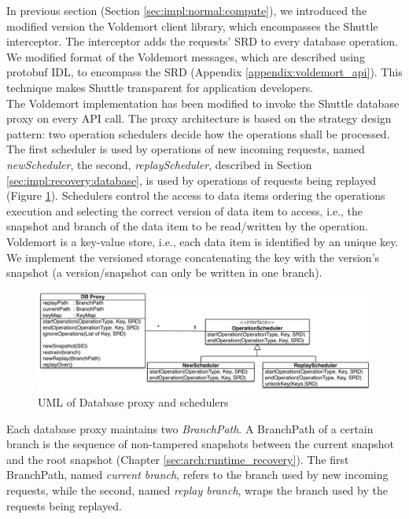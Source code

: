 In previous section (Section \ref{sec:impl:normal:compute}), we introduced the modified version the Voldemort client library, which encompasses the Shuttle interceptor. The interceptor adds the requests' \ac{SRD} to every database operation. We modified format of the Voldemort messages, which are described using \acf{protobuf} \acs{IDL}, to encompass the \ac{SRD} (Appendix \ref{appendix:voldemort_api}). This technique makes Shuttle transparent for application developers.\\


The Voldemort implementation has been modified to invoke the Shuttle database proxy on every \ac{API} call. The proxy architecture is based on the strategy design pattern: two operation schedulers decide how the operations shall be processed. The first scheduler is used by  operations of new incoming requests, named \emph{newScheduler}, the second, \emph{replayScheduler}, described in Section \ref{sec:impl:recovery:database}, is used by operations of requests being replayed (Figure \ref{fig:scheduler_uml}). Schedulers control the access to data items ordering the operations execution and selecting the correct version of data item to access, i.e., the snapshot and branch of the data item to be read/written by the operation. Voldemort is a key-value store, i.e., each data item is identified by an unique key. We implement the versioned storage concatenating the key with the version's snapshot (a version/snapshot can only be written in one branch).

\begin{figure}
  \centering
  \includegraphics[width=\textwidth]{arch/scheduler_uml}
  \caption{UML of Database proxy and schedulers}
  \label{fig:scheduler_uml}
\end{figure}

Each database proxy maintains two \emph{BranchPath}. A BranchPath of a certain branch is the sequence of non-tampered snapshots between the current snapshot and the root snapshot (Chapter \ref{sec:arch:runtime_recovery}). The first BranchPath, named \textit{current branch}, refers to the branch used by new incoming requests, while the second, named \textit{replay branch}, wraps the branch used by the requests being replayed.

